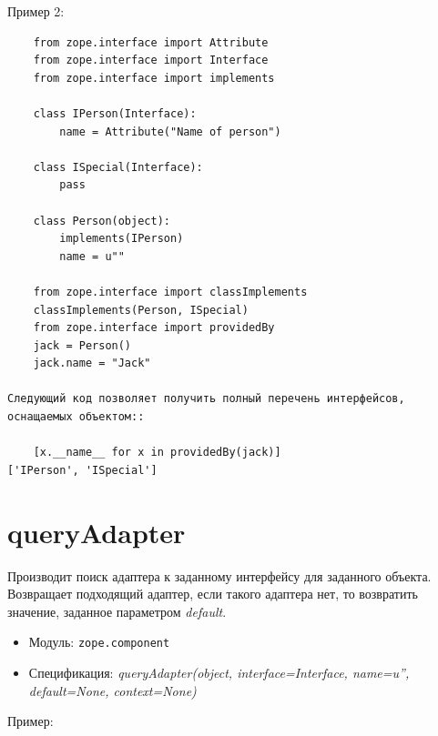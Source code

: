 \documentclass[a4paper,openany,twoside,draft]{book}
\providecommand*{\DUroletitlereference}[1]{\textsl{#1}}
\begin{document}
Пример 2:

\begin{verbatim}
    from zope.interface import Attribute
    from zope.interface import Interface
    from zope.interface import implements

    class IPerson(Interface):
        name = Attribute("Name of person")

    class ISpecial(Interface):
        pass

    class Person(object):
        implements(IPerson)
        name = u""

    from zope.interface import classImplements
    classImplements(Person, ISpecial)
    from zope.interface import providedBy
    jack = Person()
    jack.name = "Jack"

Следующий код позволяет получить полный перечень интерфейсов,
оснащаемых объектом::

    [x.__name__ for x in providedBy(jack)]
['IPerson', 'ISpecial']
\end{verbatim}


\section*{queryAdapter%
  \label{queryadapter}%
}

Производит поиск адаптера к заданному интерфейсу для заданного объекта.  Возвращает подходящий адаптер, если такого адаптера нет, то возвратить значение, заданное параметром \DUroletitlereference{default}.

\begin{itemize}

\item Модуль: \texttt{zope.component}

\item Спецификация: \DUroletitlereference{queryAdapter(object, interface=Interface, name=u'', default=None, context=None)}

\end{itemize}

Пример:
\end{document}
